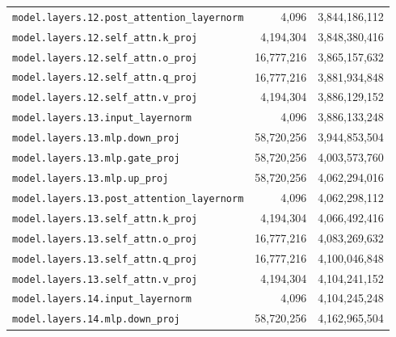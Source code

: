 \documentclass[10pt,a4paper]{article}
\theoremstyle{definition}
\begin{document}
\begin{appendices}
\begin{longtable}{p{9.5cm}rr}
\texttt{model.\allowbreak{}layers.\allowbreak{}12.\allowbreak{}post\_attention\_layernorm} & 4,096 & 3,844,186,112 \\
\texttt{model.\allowbreak{}layers.\allowbreak{}12.\allowbreak{}self\_attn.\allowbreak{}k\_proj} & 4,194,304 & 3,848,380,416 \\
\texttt{model.\allowbreak{}layers.\allowbreak{}12.\allowbreak{}self\_attn.\allowbreak{}o\_proj} & 16,777,216 & 3,865,157,632 \\
\texttt{model.\allowbreak{}layers.\allowbreak{}12.\allowbreak{}self\_attn.\allowbreak{}q\_proj} & 16,777,216 & 3,881,934,848 \\
\texttt{model.\allowbreak{}layers.\allowbreak{}12.\allowbreak{}self\_attn.\allowbreak{}v\_proj} & 4,194,304 & 3,886,129,152 \\
\texttt{model.\allowbreak{}layers.\allowbreak{}13.\allowbreak{}input\_layernorm} & 4,096 & 3,886,133,248 \\
\texttt{model.\allowbreak{}layers.\allowbreak{}13.\allowbreak{}mlp.\allowbreak{}down\_proj} & 58,720,256 & 3,944,853,504 \\
\texttt{model.\allowbreak{}layers.\allowbreak{}13.\allowbreak{}mlp.\allowbreak{}gate\_proj} & 58,720,256 & 4,003,573,760 \\
\texttt{model.\allowbreak{}layers.\allowbreak{}13.\allowbreak{}mlp.\allowbreak{}up\_proj} & 58,720,256 & 4,062,294,016 \\
\texttt{model.\allowbreak{}layers.\allowbreak{}13.\allowbreak{}post\_attention\_layernorm} & 4,096 & 4,062,298,112 \\
\texttt{model.\allowbreak{}layers.\allowbreak{}13.\allowbreak{}self\_attn.\allowbreak{}k\_proj} & 4,194,304 & 4,066,492,416 \\
\texttt{model.\allowbreak{}layers.\allowbreak{}13.\allowbreak{}self\_attn.\allowbreak{}o\_proj} & 16,777,216 & 4,083,269,632 \\
\texttt{model.\allowbreak{}layers.\allowbreak{}13.\allowbreak{}self\_attn.\allowbreak{}q\_proj} & 16,777,216 & 4,100,046,848 \\
\texttt{model.\allowbreak{}layers.\allowbreak{}13.\allowbreak{}self\_attn.\allowbreak{}v\_proj} & 4,194,304 & 4,104,241,152 \\
\texttt{model.\allowbreak{}layers.\allowbreak{}14.\allowbreak{}input\_layernorm} & 4,096 & 4,104,245,248 \\
\texttt{model.\allowbreak{}layers.\allowbreak{}14.\allowbreak{}mlp.\allowbreak{}down\_proj} & 58,720,256 & 4,162,965,504 \\

\end{longtable}
\end{appendices}
\end{document}
